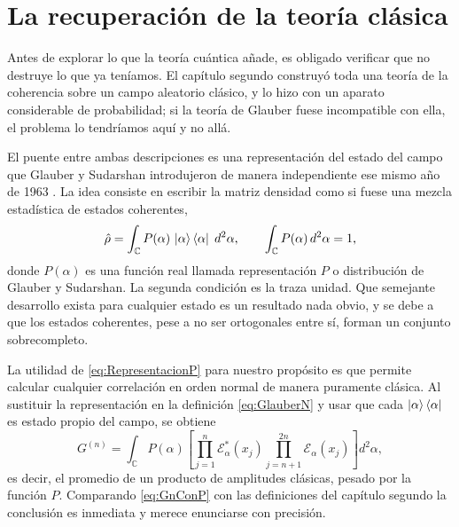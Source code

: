 \section{La recuperación de la teoría clásica}

    Antes de explorar lo que la teoría cuántica añade, es obligado verificar que no destruye lo que ya teníamos. El capítulo segundo construyó toda una teoría de la coherencia sobre un campo aleatorio clásico, y lo hizo con un aparato considerable de probabilidad; si la teoría de Glauber fuese incompatible con ella, el problema lo tendríamos aquí y no allá.

    El puente entre ambas descripciones es una representación del estado del campo que Glauber y Sudarshan introdujeron de manera independiente ese mismo año de 1963 \citep{sudarshan1963equivalence}. La idea consiste en escribir la matriz densidad como si fuese una mezcla estadística de estados coherentes,
    \begin{equation}\label{eq:RepresentacionP}
        \hat{\rho} = \int_{\mathbb{C}} P(\alpha)\,\ket{\alpha}\bra{\alpha}\;d^{2}\alpha,
        \qquad
        \int_{\mathbb{C}} P(\alpha)\,d^{2}\alpha = 1,
    \end{equation}
    donde $P(\alpha)$ es una función real llamada representación $P$ o distribución de Glauber y Sudarshan. La segunda condición es la traza unidad. Que semejante desarrollo exista para cualquier estado es un resultado nada obvio, y se debe a que los estados coherentes, pese a no ser ortogonales entre sí, forman un conjunto sobrecompleto.

    La utilidad de \eqref{eq:RepresentacionP} para nuestro propósito es que permite calcular cualquier correlación en orden normal de manera puramente clásica. Al sustituir la representación en la definición \eqref{eq:GlauberN} y usar que cada $\ket{\alpha}\bra{\alpha}$ es estado propio del campo, se obtiene
    \begin{equation}\label{eq:GnConP}
        G^{(n)} = \int_{\mathbb{C}} P(\alpha)\left[\prod_{j=1}^{n}\mathcal{E}^{*}_{\alpha}(x_{j})\prod_{j=n+1}^{2n}\mathcal{E}_{\alpha}(x_{j})\right]d^{2}\alpha,
    \end{equation}
    es decir, el promedio de un producto de amplitudes clásicas, pesado por la función $P$. Comparando \eqref{eq:GnConP} con las definiciones del capítulo segundo la conclusión es inmediata y merece enunciarse con precisión.

